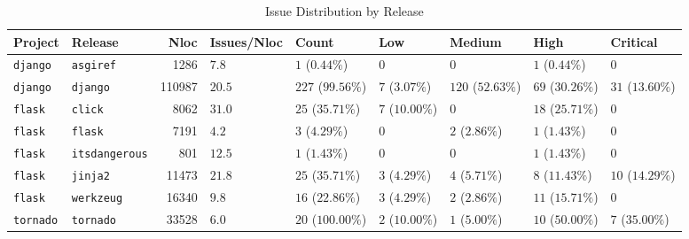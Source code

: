 \begin{table}
\caption{Issue Distribution by Release}
\label{tab:issue-release-distribution}
\begin{tabular}{llrllllll}
\toprule
Project & Release & Nloc & Issues/Nloc & Count & Low & Medium & High & Critical \\
\midrule
\texttt{django} & \texttt{asgiref} & 1286 & $7.8$ & $1$ ($0.44\%$) & $0$ & $0$ & $1$ ($0.44\%$) & $0$ \\
\texttt{django} & \texttt{django} & 110987 & $20.5$ & $227$ ($99.56\%$) & $7$ ($3.07\%$) & $120$ ($52.63\%$) & $69$ ($30.26\%$) & $31$ ($13.60\%$) \\
\texttt{flask} & \texttt{click} & 8062 & $31.0$ & $25$ ($35.71\%$) & $7$ ($10.00\%$) & $0$ & $18$ ($25.71\%$) & $0$ \\
\texttt{flask} & \texttt{flask} & 7191 & $4.2$ & $3$ ($4.29\%$) & $0$ & $2$ ($2.86\%$) & $1$ ($1.43\%$) & $0$ \\
\texttt{flask} & \texttt{itsdangerous} & 801 & $12.5$ & $1$ ($1.43\%$) & $0$ & $0$ & $1$ ($1.43\%$) & $0$ \\
\texttt{flask} & \texttt{jinja2} & 11473 & $21.8$ & $25$ ($35.71\%$) & $3$ ($4.29\%$) & $4$ ($5.71\%$) & $8$ ($11.43\%$) & $10$ ($14.29\%$) \\
\texttt{flask} & \texttt{werkzeug} & 16340 & $9.8$ & $16$ ($22.86\%$) & $3$ ($4.29\%$) & $2$ ($2.86\%$) & $11$ ($15.71\%$) & $0$ \\
\texttt{tornado} & \texttt{tornado} & 33528 & $6.0$ & $20$ ($100.00\%$) & $2$ ($10.00\%$) & $1$ ($5.00\%$) & $10$ ($50.00\%$) & $7$ ($35.00\%$) \\
\bottomrule
\end{tabular}
\end{table}

